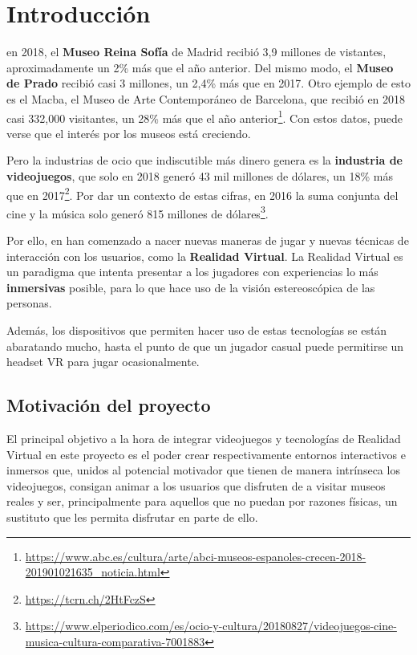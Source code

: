 \chapter{Introducción}
\label{chap:introduccion}

 en 2018, el \textbf{Museo Reina Sofía} de Madrid recibió 3,9 millones de vistantes, aproximadamente un 2\% más que el año anterior. Del mismo modo, el \textbf{Museo de Prado} recibió casi 3 millones, un 2,4\% más que en 2017. Otro ejemplo de esto es el Macba, el Museo de Arte Contemporáneo de Barcelona, que recibió en 2018 casi 332,000 visitantes, un 28\% más que el año anterior\footnote{\url{https://www.abc.es/cultura/arte/abci-museos-espanoles-crecen-2018-201901021635_noticia.html}}. Con estos datos, puede verse que el interés por los museos está creciendo.

Pero la industrias de ocio que indiscutible más dinero genera es la \textbf{industria de videojuegos}, que solo en 2018 generó 43 mil millones de dólares, un 18\% más que en 2017\footnote{\url{https://tcrn.ch/2HtFczS}}. Por dar un contexto de estas cifras, en 2016 la suma conjunta del cine y la música solo generó 815 millones de dólares\footnote{\url{https://www.elperiodico.com/es/ocio-y-cultura/20180827/videojuegos-cine-musica-cultura-comparativa-7001883}}.

Por ello, en han comenzado a nacer nuevas maneras de jugar y nuevas técnicas de interacción con los usuarios, como la \textbf{Realidad Virtual}. La Realidad Virtual es un paradigma que intenta presentar a los jugadores con experiencias lo más \textbf{inmersivas} posible, para lo que hace uso de la visión estereoscópica de las personas.

Además, los dispositivos que permiten hacer uso de estas tecnologías se están abaratando mucho, hasta el punto de que un jugador casual puede permitirse un headset \acs{VR} para jugar ocasionalmente. 

\section{Motivación del proyecto}

El principal objetivo a la hora de integrar videojuegos y tecnologías de Realidad Virtual en este proyecto es el poder crear respectivamente entornos interactivos e inmersos que, unidos al potencial motivador que tienen de manera intrínseca los videojuegos, consigan animar a los usuarios que disfruten de \MineRVa a visitar museos reales y ser, principalmente para aquellos que no puedan por razones físicas, un sustituto que les permita disfrutar en parte de ello. 

